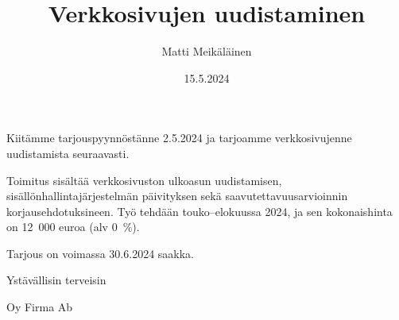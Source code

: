 \documentclass{sfs-2487-2024}
\date{15.5.2024}
\author{Matti Meikäläinen}
\title{Verkkosivujen uudistaminen}
\begin{document}
\maketitle

Kiitämme tarjouspyynnöstänne 2.5.2024 ja tarjoamme verkkosivujenne
uudistamista seuraavasti.

Toimitus sisältää verkkosivuston ulkoasun uudistamisen,
sisällönhallintajärjestelmän päivityksen sekä saavutettavuusarvioinnin
korjausehdotuksineen. Työ tehdään touko--elokuussa 2024, ja sen
kokonaishinta on 12~000 euroa (alv 0~\%).

Tarjous on voimassa 30.6.2024 saakka.

Ystävällisin terveisin

Oy Firma Ab


\vspace{\parskip}

\makecontactinfo
\end{document}
